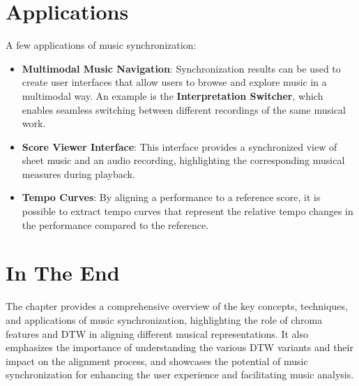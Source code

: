\documentclass[a4paper, 9pt, twocolumn]{extarticle}
\begin{document}
\section{Applications}
A few applications of music synchronization:
\begin{itemize}
  \item
        \textbf{Multimodal Music Navigation}\cite{Damm2012}: Synchronization results can be
        used to create user interfaces that allow users to browse and explore
        music in a multimodal way. An example is the \textbf{Interpretation
          Switcher}, which enables seamless switching between different
        recordings of the same musical work.
  \item
        \textbf{Score Viewer Interface}\cite{inproceedings}: This interface provides a
        synchronized view of sheet music and an audio recording, highlighting
        the corresponding musical measures during playback.
  \item
        \textbf{Tempo Curves}: By aligning a performance to a reference score,
        it is possible to extract tempo curves that represent the relative
        tempo changes in the performance compared to the reference.
\end{itemize}
\section{In The End}
The chapter provides a comprehensive overview of the key
concepts, techniques, and applications of music synchronization,
highlighting the role of chroma features and DTW in
aligning different musical representations. It also emphasizes the
importance of understanding the various DTW variants and their impact on
the alignment process, and showcases the potential of music
synchronization for enhancing the user experience and facilitating music
analysis.
\end{document}
